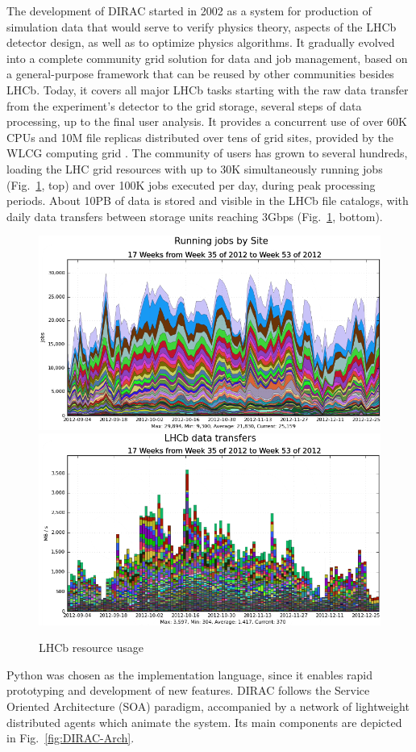 \documentclass[sort&compress,preprint,3p]{elsarticle}
\begin{document}
The development of DIRAC started in 2002 as a system for production of simulation
data that would serve to verify physics theory, aspects of the LHCb detector design, as
well as to optimize physics algorithms. It gradually evolved into a complete community
grid solution for data and job management, based on a general-purpose framework
that can be reused by other communities besides LHCb. Today, it covers all major
LHCb tasks starting with the raw data transfer from the experiment's detector to
the grid storage, several steps of data processing, up to the final user
analysis. 
It provides a concurrent use of over 60K CPUs and 10M file replicas distributed over
tens of grid sites, provided by the WLCG computing grid \cite{Bird:2011zz}. The community of users has grown to several hundreds, loading the 
LHC grid resources with up to 30K simultaneously running jobs (Fig.~\ref{fig:LHCb-resource-usage}, top) and over 100K jobs executed per day, during peak processing periods.
About 10PB of data is stored and visible in the LHCb file catalogs, with daily data transfers between storage units reaching 3Gbps (Fig.~\ref{fig:LHCb-resource-usage}, bottom).
\begin{figure}[tp!]
  \centering
  {\label{fig:Job-throughput}\includegraphics[width=0.7\linewidth]{./graphics/Figure1_1.png}}    
  \vfill
  \vspace{14pt}
{\label{fig:Data-transfers}\includegraphics[width =0.7\linewidth]{./graphics/Figure1_2.png}}
  \caption{LHCb resource usage}
  \label{fig:LHCb-resource-usage}
\end{figure}
Python was chosen as the implementation language, since it enables
rapid prototyping and development of new features. DIRAC follows the Service
Oriented Architecture (SOA) paradigm, accompanied by a network of lightweight
distributed agents which animate the system. Its main components are depicted in
Fig.~\ref{fig:DIRAC-Arch}. 
\end{document}
